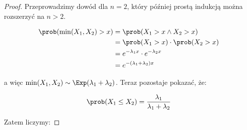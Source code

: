 \begin{proof}
	Przeprowadzimy dowód dla \(n = 2\), który później prostą indukcją można rozszerzyć na \(n > 2\).

	\begin{align*}
		\prob(\min(X_1, X_2) > x) & = \prob(X_1 > x \land X_2 > x)            \\
		                          & = \prob(X_1 > x) \cdot \prob(X_2 > x)     \\
		                          & = e^{-\lambda_1 x} \cdot e^{-\lambda_2 x} \\
		                          & = e^{-(\lambda_1 + \lambda_2)x}
	\end{align*}

	a więc \(\min(X_1, X_2) \sim \Exp(\lambda_1 + \lambda_2)\). Teraz pozostaje pokazać, że:

	\[
		\prob(X_1 \leq X_2) = \frac{\lambda_1}{\lambda_1 + \lambda_2}
	\]

	Zatem liczymy:


\end{proof}
